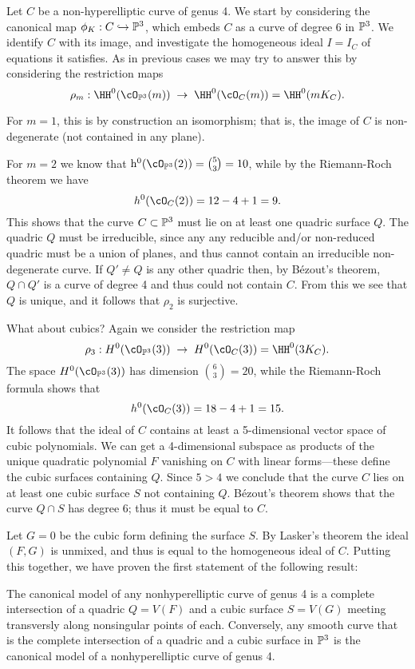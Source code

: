 Let $C$ be a non-hyperelliptic curve of genus 4. We start by considering the canonical map $\phi_K : C \hookrightarrow \PP^3$, which embeds $C$ as a curve of degree 6 in $\PP^3$. We identify $C$ with its image, and investigate the homogeneous ideal $I = I_C$ of equations it satisfies. As in previous cases we may try to answer this by considering the restriction maps
$$
\rho_m : \HH^0(\cO_{\PP^3}(m)) \; \to \; \HH^0(\cO_{C}(m)) = \HH^0(mK_C).
$$

For $m=1$, this is by construction an isomorphism; that is, the image of $C$ is non-degenerate (not contained in any plane).

For $m=2$ we know that $\h^0(\cO_{\PP^3}(2)) = \binom{5}{3} = 10$, while by the Riemann-Roch
theorem we have
$$
h^0(\cO_C(2)) = 12 - 4 + 1 = 9.
$$
This shows that the curve $C \subset \PP^3$ must lie on at least one quadric surface $Q$. The quadric $Q$ must be irreducible, since any any reducible and/or non-reduced quadric must be a union of planes, and thus cannot contain an irreducible non-degenerate curve.
If $Q'\neq Q$ is any other quadric then, by B\'ezout's theorem, $Q\cap Q'$ is a curve of degree 4 and thus could not contain $C$. From this we see that $Q$ is unique, and it follows that $\rho_2$ is surjective.

What about cubics? Again we consider the restriction map
$$
\rho_3 : H^0(\cO_{\PP^3}(3)) \; \to \; H^0(\cO_{C}(3)) = \HH^0(3K_C).
$$
The space $H^0(\cO_{\PP^3}(3))$ has dimension $\binom{6}{3} = 20$, while  the Riemann-Roch formula shows that
$$
h^0(\cO_C(3)) = 18 - 4 + 1 = 15.
$$
It follows that the ideal of $C$ contains at least a 5-dimensional vector space of cubic polynomials. We can get a 4-dimensional subspace as products of the unique quadratic polynomial $F$ vanishing on $C$ with linear forms---these define the cubic surfaces containing $Q$. Since $5 > 4$ we  conclude that the curve $C$ lies on at least one cubic surface $S$  not containing $Q$. 
B\'ezout's theorem shows that the curve $Q \cap S$ has degree 6; thus it must be equal to $C$. 

Let $G=0$ be the cubic form defining the surface $S$. By Lasker's theorem the ideal $(F,G)$ is unmixed, and thus is equal to the homogeneous ideal of $C$. Putting this together, we have proven the first statement of the following result:

\begin{theorem}
The canonical model of any nonhyperelliptic curve of genus 4 is a complete intersection of a quadric $Q = V(F)$ and a cubic surface $S = V(G)$ meeting transversly along nonsingular points of each. Conversely, any smooth curve that is the complete intersection of a quadric and a cubic surface in $\PP^3$ is the canonical model of a nonhyperelliptic curve of genus 4.
\end{theorem}
 
